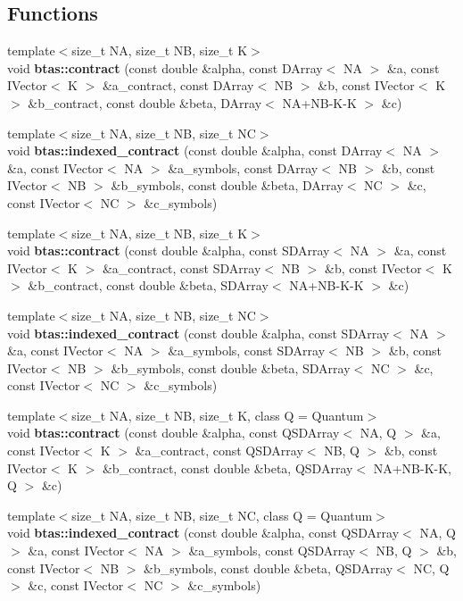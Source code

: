 \subsection*{Functions}
\begin{DoxyCompactItemize}
\item 
{\footnotesize template$<$size\-\_\-t N\-A, size\-\_\-t N\-B, size\-\_\-t K$>$ }\\void {\bf btas\-::contract} (const double \&alpha, const D\-Array$<$ N\-A $>$ \&a, const I\-Vector$<$ K $>$ \&a\-\_\-contract, const D\-Array$<$ N\-B $>$ \&b, const I\-Vector$<$ K $>$ \&b\-\_\-contract, const double \&beta, D\-Array$<$ N\-A+N\-B-\/K-\/K $>$ \&c)
\item 
{\footnotesize template$<$size\-\_\-t N\-A, size\-\_\-t N\-B, size\-\_\-t N\-C$>$ }\\void {\bf btas\-::indexed\-\_\-contract} (const double \&alpha, const D\-Array$<$ N\-A $>$ \&a, const I\-Vector$<$ N\-A $>$ \&a\-\_\-symbols, const D\-Array$<$ N\-B $>$ \&b, const I\-Vector$<$ N\-B $>$ \&b\-\_\-symbols, const double \&beta, D\-Array$<$ N\-C $>$ \&c, const I\-Vector$<$ N\-C $>$ \&c\-\_\-symbols)
\item 
{\footnotesize template$<$size\-\_\-t N\-A, size\-\_\-t N\-B, size\-\_\-t K$>$ }\\void {\bf btas\-::contract} (const double \&alpha, const S\-D\-Array$<$ N\-A $>$ \&a, const I\-Vector$<$ K $>$ \&a\-\_\-contract, const S\-D\-Array$<$ N\-B $>$ \&b, const I\-Vector$<$ K $>$ \&b\-\_\-contract, const double \&beta, S\-D\-Array$<$ N\-A+N\-B-\/K-\/K $>$ \&c)
\item 
{\footnotesize template$<$size\-\_\-t N\-A, size\-\_\-t N\-B, size\-\_\-t N\-C$>$ }\\void {\bf btas\-::indexed\-\_\-contract} (const double \&alpha, const S\-D\-Array$<$ N\-A $>$ \&a, const I\-Vector$<$ N\-A $>$ \&a\-\_\-symbols, const S\-D\-Array$<$ N\-B $>$ \&b, const I\-Vector$<$ N\-B $>$ \&b\-\_\-symbols, const double \&beta, S\-D\-Array$<$ N\-C $>$ \&c, const I\-Vector$<$ N\-C $>$ \&c\-\_\-symbols)
\item 
{\footnotesize template$<$size\-\_\-t N\-A, size\-\_\-t N\-B, size\-\_\-t K, class Q  = Quantum$>$ }\\void {\bf btas\-::contract} (const double \&alpha, const Q\-S\-D\-Array$<$ N\-A, Q $>$ \&a, const I\-Vector$<$ K $>$ \&a\-\_\-contract, const Q\-S\-D\-Array$<$ N\-B, Q $>$ \&b, const I\-Vector$<$ K $>$ \&b\-\_\-contract, const double \&beta, Q\-S\-D\-Array$<$ N\-A+N\-B-\/K-\/K, Q $>$ \&c)
\item 
{\footnotesize template$<$size\-\_\-t N\-A, size\-\_\-t N\-B, size\-\_\-t N\-C, class Q  = Quantum$>$ }\\void {\bf btas\-::indexed\-\_\-contract} (const double \&alpha, const Q\-S\-D\-Array$<$ N\-A, Q $>$ \&a, const I\-Vector$<$ N\-A $>$ \&a\-\_\-symbols, const Q\-S\-D\-Array$<$ N\-B, Q $>$ \&b, const I\-Vector$<$ N\-B $>$ \&b\-\_\-symbols, const double \&beta, Q\-S\-D\-Array$<$ N\-C, Q $>$ \&c, const I\-Vector$<$ N\-C $>$ \&c\-\_\-symbols)
\end{DoxyCompactItemize}
